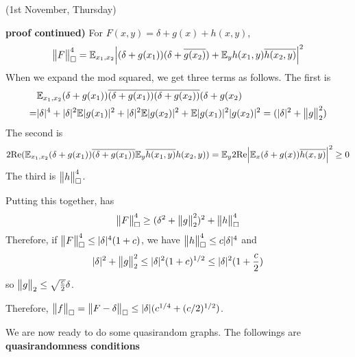 \documentclass[10pt,a4paper]{report}
\newenvironment{proof}
{\begin{changemargin}{1cm}{0.5cm}
	}%
	{\end{changemargin}
}
\begin{document}
\newday

(1st November, Thursday)
\s

\begin{proof}
\textbf{proof continued)} For $F(x,y) = \delta + g(x) + h(x,y)$,
\begin{align*}
\bigl\lVert F\bigr\rVert_{\tiny{\square}}^4 =  \mathbb{E}_{x_1,x_2} \Big| (\delta + g(x_1))(\delta + \overline{g(x_2)}) + \mathbb{E}_y h(x_1,y) \overline{h(x_2,y)} \Big|^2
\end{align*}
When we expand the mod squared, we get three terms as follows. The first is
\begin{align*}
& \mathbb{E}_{x_1, x_2} (\delta + g(x_1)) \overline{(\delta + g(x_1))} \overline{(\delta + g(x_2))} (\delta + g(x_2) \\
=& |\delta|^4 + |\delta|^2 \mathbb{E} |g(x_1)|^2 + |\delta|^2 \mathbb{E} |g(x_2)|^2 + \mathbb{E} |g(x_1)|^2 |g(x_2)|^2 = (|\delta|^2 + \bigl\lVert g\bigr\rVert_{2}^2)
\end{align*}
The second is
\begin{align*}
2 \text{Re}(\mathbb{E}_{x_1,x_2} (\delta + g(x_1)) \overline{(\delta + g(x_1))} \mathbb{E}_y \overline{h(x_1,y)} h(x_2,y)) = \mathbb{E}_y 2\text{Re} \Big| \mathbb{E}_x (\delta + g(x)) \overline{h(x,y)} \Big|^2 \geq 0
\end{align*}
The third is $\bigl\lVert h\bigr\rVert_{\tiny{\square}}^4$.

\quad Putting this together, has
\begin{align*}
\bigl\lVert F\bigr\rVert_{\tiny{\square}}^4 \geq (\delta^2 + \bigl\lVert g\bigr\rVert_{2}^2)^2 + \bigl\lVert h\bigr\rVert_{\tiny{\square}}^4
\end{align*}
Therefore, if $\bigl\lVert F\bigr\rVert_{\tiny{\square}}^4 \leq |\delta|^4 (1+c)$, we have $\bigl\lVert h\bigr\rVert_{\tiny{\square}}^4 \leq c|\delta|^4$ and
\begin{align*}
|\delta|^2 + \bigl\lVert g\bigr\rVert_{2}^2 \leq |\delta|^2 (1+c)^{1/2} \leq |\delta|^2 (1+ \frac{c}{2})
\end{align*}
so $\bigl\lVert g\bigr\rVert_{2} \leq \sqrt{\frac{c}{2}}\delta$.

\quad Therefore, $\bigl\lVert f\bigr\rVert_{\tiny{\square}} = \bigl\lVert F-\delta\bigr\rVert_{\tiny{\square}} \leq |\delta| (c^{1/4} + (c/2)^{1/2})$.

\eop
\end{proof}
\s

We are now ready to do some quasirandom graphs. The followings are \textbf{quasirandomness conditions}
\s
\end{document}
